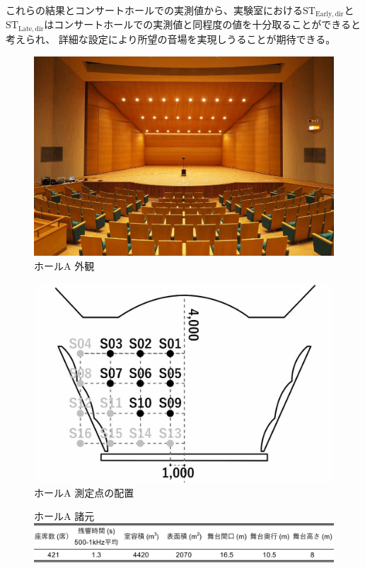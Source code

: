 \documentclass[11pt,a4j]{jreport}
\begin{document}
    これらの結果とコンサートホールでの実測値から、実験室における$\mathrm{ST_{Early,dir}}$と
    $\mathrm{ST_{Late,dir}}$はコンサートホールでの実測値と同程度の値を十分取ることができると考えられ、
    詳細な設定により所望の音場を実現しうることが期待できる。

    


  \newpage
    
  \begin{figure}[H]
    \begin{minipage}{.5\linewidth} %
      \centering
      \includegraphics[width=.7\linewidth]{images/measuredHalls/resized/picture_a.jpg}
      \\ホールA 外観
    \end{minipage}%
    \begin{minipage}{.5\linewidth} %
      \centering
      \includegraphics[width=.7\linewidth]{images/measuredHalls/resized/flat_a.jpg}
      \\ホールA 測定点の配置
    \end{minipage}

    \begin{minipage}{1\linewidth}
      \centering
      ホールA 諸元\\
      \includegraphics[width=.8\linewidth]{images/measuredHalls/informationTable/a.pdf}
    \end{minipage}
  \end{figure}
\end{document}
